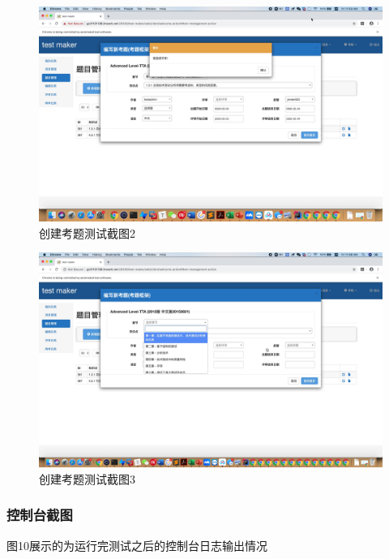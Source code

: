 \documentclass[hyperref, a4paper]{ctexart}
\begin{document}
\begin{figure}
  \centering
  \includegraphics[scale=0.1]{./screenshots/CreateQ2.jpg}
  \caption{创建考题测试截图2}\label{8}
\end{figure}

\begin{figure}
  \centering
  \includegraphics[scale=0.1]{./screenshots/CreateQ3.jpg}
  \caption{创建考题测试截图3}\label{9}
\end{figure}

\pagebreak

\hypertarget{ux63a7ux5236ux53f0ux622aux56fe}{%
\subsubsection{控制台截图}\label{ux63a7ux5236ux53f0ux622aux56fe}}

图10展示的为运行完测试之后的控制台日志输出情况
\end{document}
